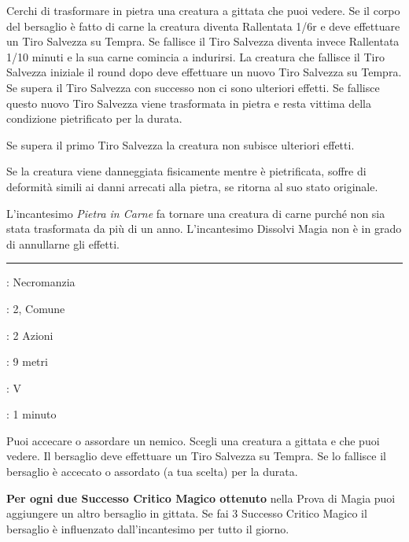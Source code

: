 \begin{multicols}{2}
Cerchi di trasformare in pietra una creatura a gittata che puoi vedere. Se il corpo del bersaglio è fatto di carne la creatura diventa Rallentata 1/6r e deve effettuare un Tiro Salvezza su Tempra. Se fallisce il Tiro Salvezza diventa invece Rallentata 1/10 minuti e la sua carne comincia a indurirsi.
La creatura che fallisce il Tiro Salvezza iniziale il round dopo deve effettuare un nuovo Tiro Salvezza su Tempra. Se supera il Tiro Salvezza con successo non ci sono ulteriori effetti. Se fallisce questo nuovo Tiro Salvezza viene trasformata in pietra e resta vittima della condizione pietrificato per la durata.

Se supera il primo Tiro Salvezza la creatura non subisce ulteriori effetti.

Se la creatura viene danneggiata fisicamente mentre è pietrificata, soffre di deformità simili ai danni arrecati alla pietra, se ritorna al suo stato originale.

L'incantesimo \emph{Pietra in Carne} fa tornare una creatura di carne purché non sia stata trasformata da più di un anno. L'incantesimo Dissolvi Magia non è in grado di annullarne gli effetti.

\smallskip\noindent\rule{\linewidth}{2pt} \hypertarget{Cecità/Sordità}{}\smallskip{}
\noindent
\begin{description}[noitemsep, topsep=0pt, parsep=0pt, partopsep=0pt, leftmargin=0cm, labelwidth=2.8cm]
	\item[\textbf{Lista di Magia}]: Necromanzia
	\item[\textbf{Livello}]: 2, Comune
	\item[\textbf{T. di Lancio}]: 2 Azioni
	\item[\textbf{Gittata}]: 9 metri
	\item[\textbf{Componenti}]: V
	\item[\textbf{Durata}]: 1 minuto
\end{description}

Puoi accecare o assordare un nemico. Scegli una creatura a gittata e che puoi vedere. Il bersaglio deve effettuare un Tiro Salvezza su Tempra. Se lo fallisce il bersaglio è accecato o assordato (a tua scelta) per la durata.

\textbf{Per ogni due Successo Critico Magico ottenuto} nella Prova di Magia puoi aggiungere un altro bersaglio in gittata. Se fai 3 Successo Critico Magico il bersaglio è influenzato dall'incantesimo per tutto il giorno.


\end{multicols}
